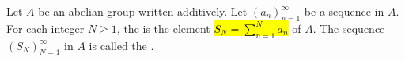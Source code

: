 \begin{definition} \label{definition:partial_sum_of_a_sequence_in_an_abelian_group}
    Let $A$ be an abelian group written additively. Let $(a_n)_{n=1}^\infty$ be a sequence in $A$. For each integer $N \geq 1$, the  is the element
    \hl{$S_N = \sum_{n=1}^N a_n$}
    of $A$. The sequence $(S_N)_{N=1}^\infty$ in $A$ is called the .
\end{definition}
